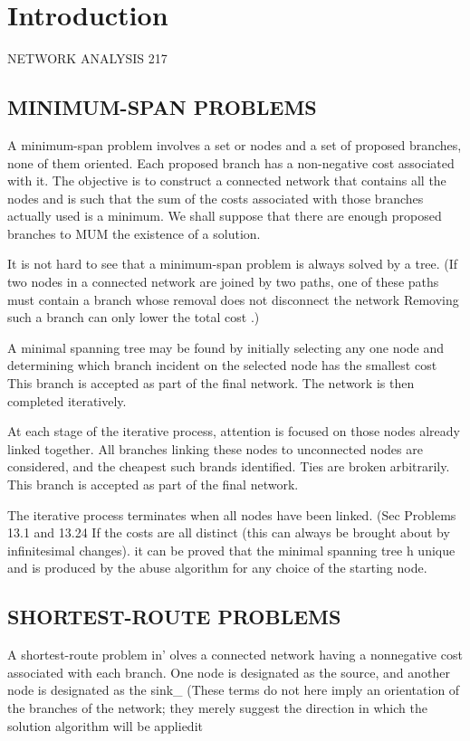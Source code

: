 \documentclass[11pt]{article} %
\begin{document}
\maketitle

\section{Introduction}

NETWORK ANALYSIS 217 
\subsection{MINIMUM-SPAN PROBLEMS} A minimum-span problem involves a set or nodes and a set of proposed branches, none of them oriented. Each proposed branch has a non-negative cost associated with it. The objective is to construct a connected network that contains all the nodes and is such that the sum of the costs associated with those branches actually used is a minimum. We shall suppose that there are enough proposed branches to MUM the existence of a solution. 

It is not hard to see that a minimum-span problem is always solved by a tree. (If two nodes in a connected network are joined by two paths, one of these paths must contain a branch whose removal does not disconnect the network Removing such a branch can only lower the total cost .) 

A minimal spanning tree may be found by initially selecting any one node and determining which branch incident on the selected node has the smallest cost This branch is accepted as part of the final network. The network is then completed iteratively. 

At each stage of the iterative process, attention is focused on those nodes already linked together. All branches linking these nodes to unconnected nodes are considered, and the cheapest such brands identified. Ties are broken arbitrarily. This branch is accepted as part of the final network. 

The iterative process terminates when all nodes have been linked. (Sec Problems 13.1 and 13.24 If the costs are all distinct (this can always be brought about by infinitesimal changes). it can be proved that the minimal spanning tree h unique and is produced by the abuse algorithm for any choice of the starting node. 

\subsection{SHORTEST-ROUTE PROBLEMS} A shortest-route problem in' olves a connected network having a nonnegative cost associated with each branch. One node is designated as the source, and another node is designated as the sink_ (These terms do not here imply an orientation of the branches of the network; they merely suggest the direction in which the solution algorithm will be appliedit 
\end{document}
